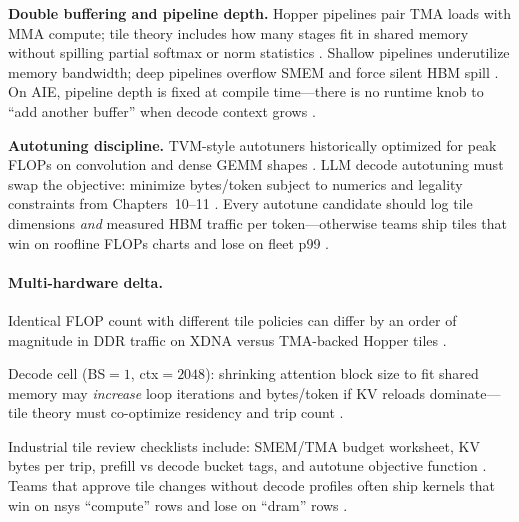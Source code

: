 \textbf{Double buffering and pipeline depth.} Hopper pipelines pair TMA loads with MMA compute; tile theory includes how many stages fit in shared memory without spilling partial softmax or norm statistics \citep{nvidia2022hopper,semianalysis2024tma,dao2022flashattention}. Shallow pipelines underutilize memory bandwidth; deep pipelines overflow SMEM and force silent HBM spill \citep{memoryfloor2026,yirage2026}. On AIE, pipeline depth is fixed at compile time---there is no runtime knob to ``add another buffer'' when decode context grows \citep{amd2024xdna,amd2024aie,chen2020compilerbasedhardw}.

\textbf{Autotuning discipline.} TVM-style autotuners historically optimized for peak FLOPs on convolution and dense GEMM shapes \citep{dlbook,chen2020compilerbasedhardw}. LLM decode autotuning must swap the objective: minimize bytes/token subject to numerics and legality constraints from Chapters~10--11 \citep{dao2022flashattention,yirage2026,patel2025llminference}. Every autotune candidate should log tile dimensions \emph{and} measured HBM traffic per token---otherwise teams ship tiles that win on roofline FLOPs charts and lose on fleet p99 \citep{taxbreak2026,memoryfloor2026,semianalysis2024tma}.

\paragraph{Multi-hardware delta.} Identical FLOP count with different tile policies can differ by an order of magnitude in DDR traffic on XDNA versus TMA-backed Hopper tiles \citep{amd2024xdna,nvidia2022hopper,semianalysis2024tma,dlbook}.

\begin{example}
Decode cell (BS${=}1$, ctx${=}2048$): shrinking attention block size to fit shared memory may \emph{increase} loop iterations and bytes/token if KV reloads dominate---tile theory must co-optimize residency and trip count \citep{dao2022flashattention,memoryfloor2026,taxbreak2026,yirage2026}.
\end{example}

Industrial tile review checklists include: SMEM/TMA budget worksheet, KV bytes per trip, prefill vs decode bucket tags, and autotune objective function \citep{semianalysis2024tma,memoryfloor2026,yirage2026,chen2020compilerbasedhardw,patel2025llminference}. Teams that approve tile changes without decode profiles often ship kernels that win on nsys ``compute'' rows and lose on ``dram'' rows \citep{taxbreak2026,memoryfloor2026,dao2022flashattention,amd2024xdna,dlbook}.

